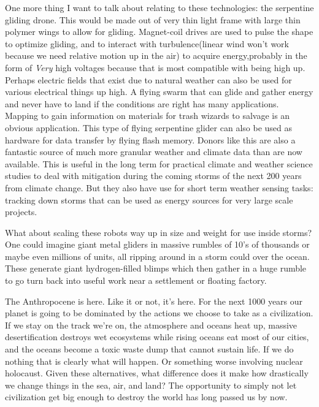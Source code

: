 One more thing I want to talk about relating to these technologies: the
serpentine gliding drone. This would be made out of very thin light
frame with large thin polymer wings to allow for gliding. Magnet-coil
drives are used to pulse the shape to optimize gliding, and to interact
with turbulence(linear wind won't work because we need relative motion
up in the air) to acquire energy,probably in the form of \emph{Very}
high voltages because that is most compatible with being high up.
Perhaps electric fields that exist due to natural weather can also be
used for various electrical things up high. A flying swarm that can
glide and gather energy and never have to land if the conditions are
right has many applications. Mapping to gain information on materials
for trash wizards to salvage is an obvious application. This type of
flying serpentine glider can also be used as hardware for data transfer
by flying flash memory. Donors like this are also a fantastic source of
much more granular weather and climate data than are now available. This
is useful in the long term for practical climate and weather science
studies to deal with mitigation during the coming storms of the next 200
years from climate change. But they also have use for short term weather
sensing tasks: tracking down storms that can be used as energy sources
for very large scale projects.

What about scaling these robots way up in size and weight for use inside
storms? One could imagine giant metal gliders in massive rumbles of 10's
of thousands or maybe even millions of units, all ripping around in a
storm could over the ocean. These generate giant hydrogen-filled blimps
which then gather in a huge rumble to go turn back into useful work near
a settlement or floating factory.

The Anthropocene is here. Like it or not, it's here. For the next 1000
years our planet is going to be dominated by the actions we choose to
take as a civilization. If we stay on the track we're on, the atmosphere
and oceans heat up, massive desertification destroys wet ecosystems
while rising oceans eat most of our cities, and the oceans become a
toxic waste dump that cannot sustain life. If we do nothing that is
clearly what will happen. Or something worse involving nuclear
holocaust. Given these alternatives, what difference does it make how
drastically we change things in the sea, air, and land? The opportunity
to simply not let civilization get big enough to destroy the world has
long passed us by now.


